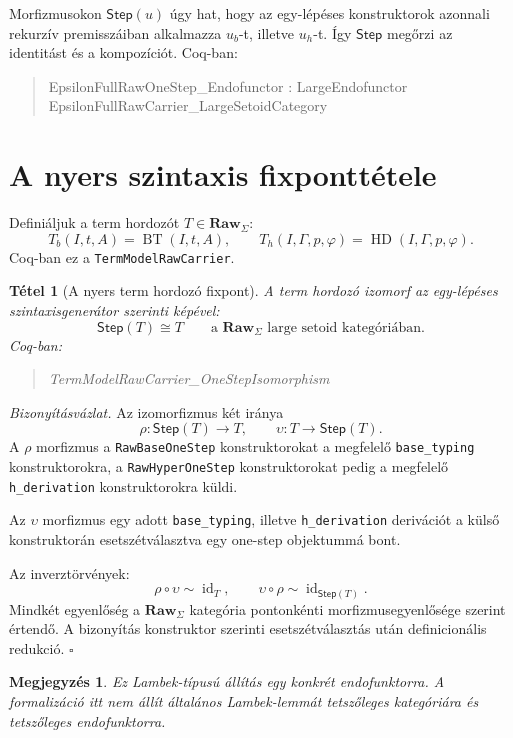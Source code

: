 \documentclass[11pt]{article}
\newtheorem{theorem}{Tétel}
\newtheorem{remark}{Megjegyzés}
\newenvironment{proofsketch}
  {\par\noindent\textit{Bizonyításvázlat.}}
  {\hfill$\square$\par}
\newenvironment{coqblock}
  {\begin{quote}\small\ttfamily\obeylines}
  {\end{quote}}
\newcommand{\Raw}{\mathbf{Raw}_{\Sigma}}
\newcommand{\Step}{\mathsf{Step}}
\newcommand{\BT}{\operatorname{BT}}
\newcommand{\HD}{\operatorname{HD}}
\newcommand{\id}{\operatorname{id}}
\begin{document}
Morfizmusokon $\Step(u)$ úgy hat, hogy az egy-lépéses konstruktorok
azonnali rekurzív premisszáiban alkalmazza $u_b$-t, illetve $u_h$-t.
Így $\Step$ megőrzi az identitást és a kompozíciót. Coq-ban:
\begin{coqblock}
EpsilonFullRawOneStep\_Endofunctor :
  LargeEndofunctor EpsilonFullRawCarrier\_LargeSetoidCategory
\end{coqblock}

\section{A nyers szintaxis fixponttétele}

Definiáljuk a term hordozót $T\in\Raw$:
\[
  T_b(I,t,A)=\BT(I,t,A),
  \qquad
  T_h(I,\Gamma,p,\varphi)=\HD(I,\Gamma,p,\varphi).
\]
Coq-ban ez a \texttt{TermModelRawCarrier}.

\begin{theorem}[A nyers term hordozó fixpont]
A term hordozó izomorf az egy-lépéses szintaxisgenerátor szerinti képével:
\[
  \Step(T)\cong T
  \qquad\text{a }\Raw\text{ large setoid kategóriában.}
\]
Coq-ban:
\begin{coqblock}
TermModelRawCarrier\_OneStepIsomorphism
\end{coqblock}
\end{theorem}

\begin{proofsketch}
Az izomorfizmus két iránya
\[
  \rho:\Step(T)\to T,
  \qquad
  \upsilon:T\to \Step(T).
\]
A $\rho$ morfizmus a \texttt{RawBaseOneStep} konstruktorokat a megfelelő
\texttt{base\_typing} konstruktorokra, a \texttt{RawHyperOneStep}
konstruktorokat pedig a megfelelő \texttt{h\_derivation} konstruktorokra
küldi.

Az $\upsilon$ morfizmus egy adott \texttt{base\_typing}, illetve
\texttt{h\_derivation} derivációt a külső konstruktorán esetszétválasztva
egy one-step objektummá bont.

Az inverztörvények:
\[
  \rho\circ\upsilon \sim \id_T,
  \qquad
  \upsilon\circ\rho \sim \id_{\Step(T)}.
\]
Mindkét egyenlőség a $\Raw$ kategória pontonkénti
morfizmusegyenlősége szerint értendő. A bizonyítás konstruktor szerinti
esetszétválasztás után definicionális redukció.
\end{proofsketch}

\begin{remark}
Ez Lambek-típusú állítás egy konkrét endofunktorra. A formalizáció itt nem
állít általános Lambek-lemmát tetszőleges kategóriára és tetszőleges
endofunktorra.
\end{remark}
\end{document}
